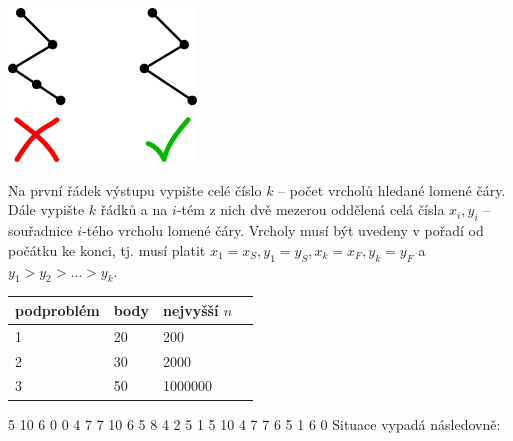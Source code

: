 \begin{center}
\includegraphics[width=5cm]{img/skiing1}
\end{center}

Na první řádek výstupu vypište celé číslo $k$ -- počet vrcholů hledané lomené čáry.
Dále vypište $k$ řádků a na $i$-tém z nich dvě mezerou oddělená celá čísla $x_i, y_i$ -- souřadnice $i$-tého vrcholu lomené čáry.
Vrcholy musí být uvedeny v pořadí od počátku ke konci, tj. musí platit
$x_1 = x_S, y_1 = y_S, x_k = x_F, y_k = y_F$ a $y_1 > y_2 > \dots > y_k$.


\begin{center}
\begin{tabular}{|l|l|l|l|}
\hline
podproblém & body & nejvyšší $n$                 \\ \hline
1       & 20     & 200                                          \\ \hline
2       & 30     & 2000                                         \\ \hline
3       & 50     & 1000000                                        \\ \hline
\end{tabular}
\end{center}



5 10 6 0
0 4 7
7 10 6
5 8 4
2 5 1
5 10
4 7
7 6
5 1
6 0
\sampleCOMMENT
Situace vypadá následovně:
\sampleEND
{}


